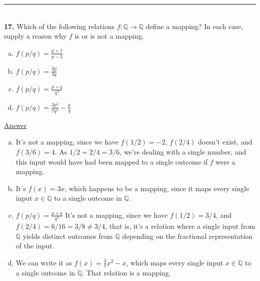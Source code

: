 \documentclass{article}[10pt]
\newenvironment{exercise}[1]
    {\noindent\rule{2cm}{0.4pt} \\
     \textbf{#1.}}
    {}
\newcommand{\answer}{

  \underline{Answer}

}
\begin{document}
\begin{exercise}{17}
  Which of the following relations $f : \mathds{Q} \to \mathds{Q}$
  define a mapping?
  In each case, supply a reason why $f$ is or is not a mapping.
  \begin{enumerate}[(a)]
    \item $f(p/q) = \frac{p+1}{p-2}$
    \item $f(p/q) = \frac{3p}{3q}$
    \item $f(p/q) = \frac{p+q}{q^2}$
    \item $f(p/q) = \frac{3p^2}{7q^2} - \frac{p}{q}$
  \end{enumerate}
  \answer
  \begin{enumerate}[(a)]
    \item
      It's not a mapping, since we have $f(1/2) = -2$,
      $f(2/4)$ doesn't exist, and $f(3/6) = 4$.
      As $1/2 = 2/4 = 3/6$, we're dealing with a single number,
      and this input would have had been mapped to a single outcome
      if $f$ were a mapping.
    \item
      It's $f(x) = 3x$, which happens to be a mapping,
      since it maps every single input $x \in \mathds{Q}$
      to a single outcome in $\mathds{Q}$.
    \item $f(p/q) = \frac{p+q}{q^2}$
      It's not a mapping, since we have $f(1/2) = 3/4$,
      and $f(2/4) = 6/16 = 3/8 \ne 3/4$,
      that is,
      it's a relation where a single input from $\mathds{Q}$
      yields distinct outcomes from $\mathds{Q}$
      depending on the fractional representation of the input.
    \item
      We can write it as $f(x) = \frac{3}{7}x^2 - x$,
      which maps every single input $x \in \mathds{Q}$
      to a single outcome in $\mathds{Q}$.
      That relation is a mapping.
  \end{enumerate}
\end{exercise}
\end{document}
